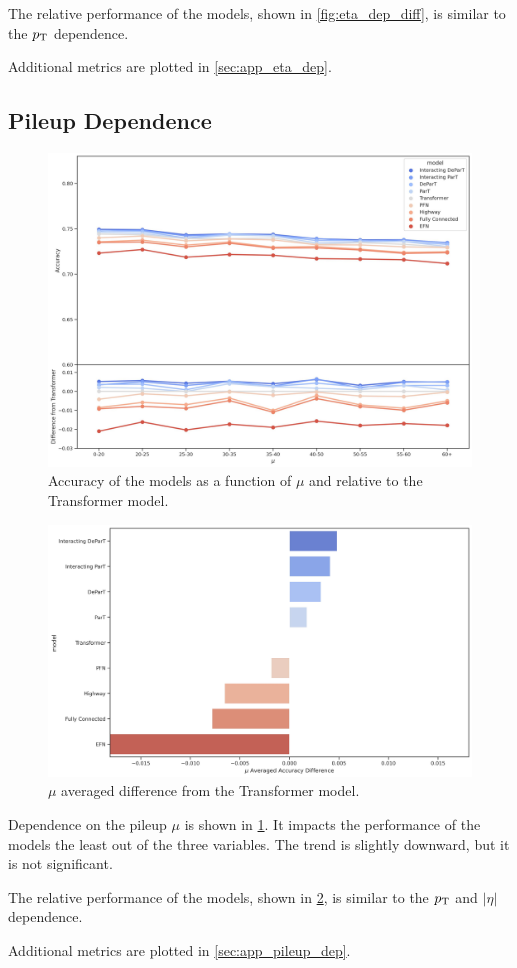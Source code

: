 The relative performance of the models, shown in \cref{fig:eta_dep_diff}, is similar to the $p_\text{T}$ dependence.

Additional metrics are plotted in \cref{sec:app_eta_dep}.

\FloatBarrier

\subsection{Pileup Dependence}
\label{sec:mu_dependance}
\begin{figure}[htb]
    \centering
    \includegraphics[width=1\linewidth]{src/plots/results/mu_dep/relative_accuracy.jpg}
    \caption{Accuracy of the models as a function of $\mu$ and relative to the Transformer model.}
    \label{fig:mu_dep_acc}
\end{figure}
\begin{figure}[htb]
    \centering
    \includegraphics[width=1\linewidth]{src/plots/results/mu_dep/relative_error.jpg}
    \caption{$\mu$ averaged difference from the Transformer model.}
    \label{fig:mu_dep_diff}
\end{figure}
Dependence on the pileup $\mu$ is shown in \cref{fig:mu_dep_acc}.
It impacts the performance of the models the least out of the three variables.
The trend is slightly downward, but it is not significant.

The relative performance of the models, shown in \cref{fig:mu_dep_diff}, is similar to the $p_\text{T}$ and $|\eta|$ dependence.

Additional metrics are plotted in \cref{sec:app_pileup_dep}.